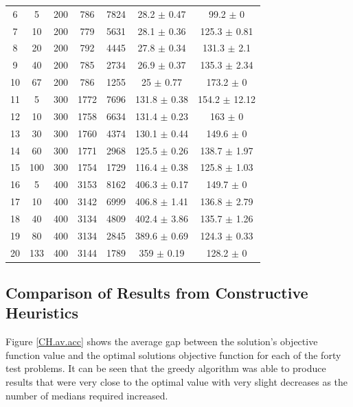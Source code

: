 \documentclass[11pt]{article}
\begin{document}
\begin{table}[]
{\begin{tabular}{ccccccc}
					6 & 5 & 200 & 786 & 7824 & 28.2 $\pm$ 0.47 & 99.2 $\pm$ 0 \\
					7 & 10 & 200 & 779 & 5631 & 28.1 $\pm$ 0.36 & 125.3 $\pm$ 0.81 \\
					8 & 20 & 200 & 792 & 4445 & 27.8 $\pm$ 0.34 & 131.3 $\pm$ 2.1 \\
					9 & 40 & 200 & 785 & 2734 & 26.9 $\pm$ 0.37 & 135.3 $\pm$ 2.34 \\
					10 & 67 & 200 & 786 & 1255 & 25 $\pm$ 0.77 & 173.2 $\pm$ 0 \\
					\rowcolor[HTML]{EFEFEF} 
					11 & 5 & 300 & 1772 & 7696 & 131.8 $\pm$ 0.38 & 154.2 $\pm$ 12.12 \\
					\rowcolor[HTML]{EFEFEF} 
					12 & 10 & 300 & 1758 & 6634 & 131.4 $\pm$ 0.23 & 163 $\pm$ 0 \\
					\rowcolor[HTML]{EFEFEF} 
					13 & 30 & 300 & 1760 & 4374 & 130.1 $\pm$ 0.44 & 149.6 $\pm$ 0 \\
					\rowcolor[HTML]{EFEFEF} 
					14 & 60 & 300 & 1771 & 2968 & 125.5 $\pm$ 0.26 & 138.7 $\pm$ 1.97 \\
					\rowcolor[HTML]{EFEFEF} 
					15 & 100 & 300 & 1754 & 1729 & 116.4 $\pm$ 0.38 & 125.8 $\pm$ 1.03 \\
					16 & 5 & 400 & 3153 & 8162 & 406.3 $\pm$ 0.17 & 149.7 $\pm$ 0 \\
					17 & 10 & 400 & 3142 & 6999 & 406.8 $\pm$ 1.41 & 136.8 $\pm$ 2.79 \\
					18 & 40 & 400 & 3134 & 4809 & 402.4 $\pm$ 3.86 & 135.7 $\pm$ 1.26 \\
					19 & 80 & 400 & 3134 & 2845 & 389.6 $\pm$ 0.69 & 124.3 $\pm$ 0.33 \\
					20 & 133 & 400 & 3144 & 1789 & 359 $\pm$ 0.19 & 128.2 $\pm$ 0
				\end{tabular}%
			}
		\end{table}

	\subsection{Comparison of Results from Constructive Heuristics} \label{classicheuristics.constructive.results}

	Figure \ref{CH.av.acc} shows the average gap between the solution's objective function value and the optimal solutions objective function for each of the forty test problems.  It can be seen that the greedy algorithm was able to produce results that were very close to the optimal value with very slight decreases as the number of medians required increased. 
	
\end{document}
